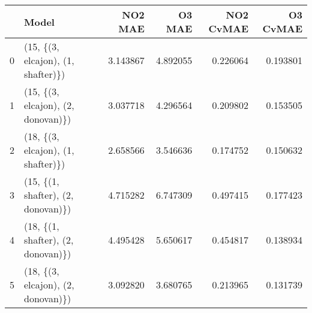 \begin{tabular}{llrrrr}
\toprule
{} &                               Model &   NO2 MAE &    O3 MAE &  NO2 CvMAE &  O3 CvMAE \\
\midrule
0 &  (15, \{(3, elcajon), (1, shafter)\}) &  3.143867 &  4.892055 &   0.226064 &  0.193801 \\
1 &  (15, \{(3, elcajon), (2, donovan)\}) &  3.037718 &  4.296564 &   0.209802 &  0.153505 \\
2 &  (18, \{(3, elcajon), (1, shafter)\}) &  2.658566 &  3.546636 &   0.174752 &  0.150632 \\
3 &  (15, \{(1, shafter), (2, donovan)\}) &  4.715282 &  6.747309 &   0.497415 &  0.177423 \\
4 &  (18, \{(1, shafter), (2, donovan)\}) &  4.495428 &  5.650617 &   0.454817 &  0.138934 \\
5 &  (18, \{(3, elcajon), (2, donovan)\}) &  3.092820 &  3.680765 &   0.213965 &  0.131739 \\
\bottomrule
\end{tabular}
